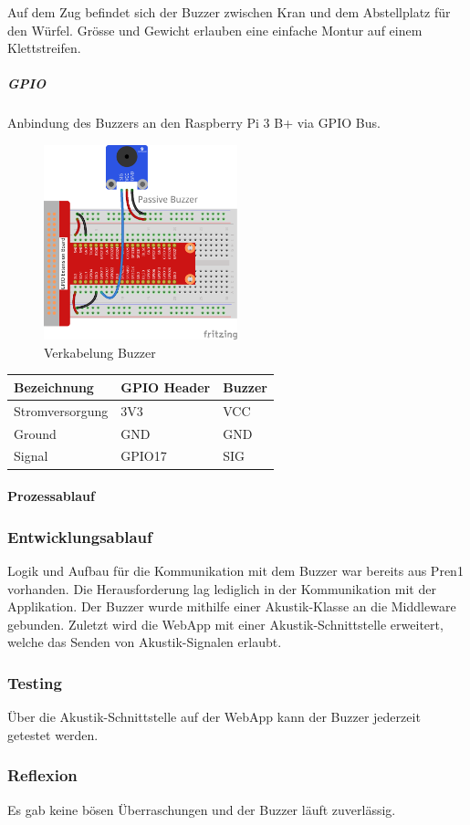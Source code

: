 \documentclass[../../main.tex]{subfiles}
\begin{document}
Auf dem Zug befindet sich der Buzzer zwischen Kran und dem Abstellplatz für den Würfel. Grösse und Gewicht erlauben eine einfache Montur auf einem Klettstreifen.

\subparagraph{GPIO}
Anbindung des Buzzers an den Raspberry Pi 3 B+ via GPIO Bus.

\begin{figure}[H] \centering
    \includegraphics[width=0.5\textwidth]{VerkabelungAkustik}
    \caption{Verkabelung Buzzer}
    \label{fig:Buzzer}
\end{figure}
\begin{table}[H]
    \begin{center}
    \begin{tabular}{lll}
    \hline
    Bezeichnung     & GPIO Header & Buzzer \\ \hline
    Stromversorgung & 3V3      & VCC    \\ \hline
    Ground          & GND      & GND    \\ \hline
    Signal          & GPIO17   & SIG    \\ \hline
    \end{tabular}
    \end{center}
\end{table}

\paragraph{Prozessablauf}

\subsubsection{Entwicklungsablauf}
Logik und Aufbau für die Kommunikation mit dem Buzzer war bereits aus Pren1 vorhanden. Die Herausforderung lag lediglich in der Kommunikation mit der Applikation. Der Buzzer wurde mithilfe einer Akustik-Klasse an die Middleware gebunden. Zuletzt wird die WebApp mit einer Akustik-Schnittstelle erweitert, welche das Senden von Akustik-Signalen erlaubt. 

\subsubsection{Testing}
Über die Akustik-Schnittstelle auf der WebApp kann der Buzzer jederzeit getestet werden.

\subsubsection{Reflexion}
Es gab keine bösen Überraschungen und der Buzzer läuft zuverlässig. 
\end{document}
